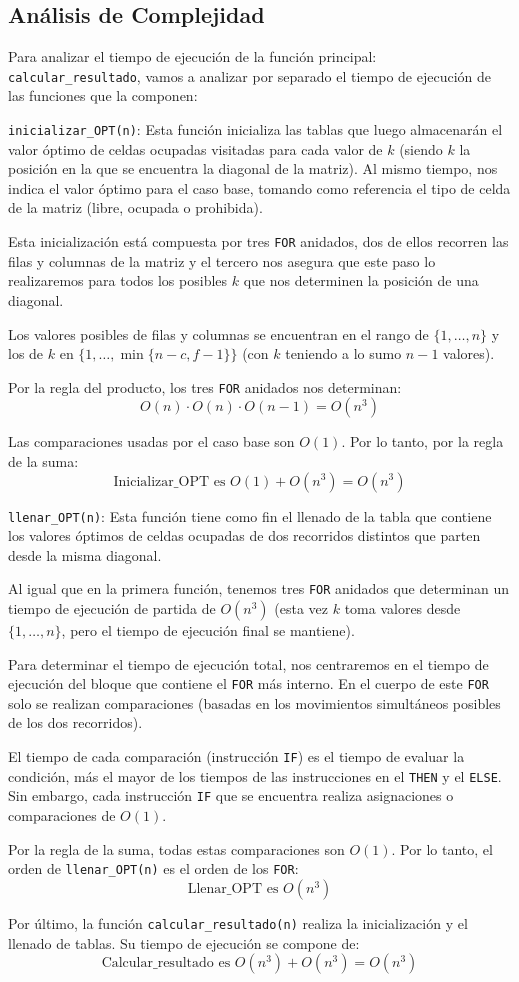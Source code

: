 \subsection{Análisis de Complejidad}
Para analizar el tiempo de ejecución de la función principal: \texttt{calcular\_resultado}, vamos a analizar por separado el tiempo de ejecución de las funciones que la componen:

\texttt{inicializar\_OPT(n)}: Esta función inicializa las tablas que luego almacenarán el valor óptimo de celdas ocupadas visitadas para cada valor de \( k \) (siendo \( k \) la posición en la que se encuentra la diagonal de la matriz). Al mismo tiempo, nos indica el valor óptimo para el caso base, tomando como referencia el tipo de celda de la matriz (libre, ocupada o prohibida).

Esta inicialización está compuesta por tres \texttt{FOR} anidados, dos de ellos recorren las filas y columnas de la matriz y el tercero nos asegura que este paso lo realizaremos para todos los posibles \( k \) que nos determinen la posición de una diagonal.

Los valores posibles de filas y columnas se encuentran en el rango de \(\{1,\ldots,n\}\) y los de \( k \) en \(\{1,\ldots,\min\{n-c,f-1\}\}\) (con \( k \) teniendo a lo sumo \( n-1 \) valores).

Por la regla del producto, los tres \texttt{FOR} anidados nos determinan:
\[
	O(n) \cdot O(n) \cdot O(n-1) = O(n^3)
\]

Las comparaciones usadas por el caso base son \( O(1) \). Por lo tanto, por la regla de la suma:
\[
	\text{Inicializar\_OPT es } O(1) + O(n^3) = O(n^3)
\]

\texttt{llenar\_OPT(n)}: Esta función tiene como fin el llenado de la tabla que contiene los valores óptimos de celdas ocupadas de dos recorridos distintos que parten desde la misma diagonal.

Al igual que en la primera función, tenemos tres \texttt{FOR} anidados que determinan un tiempo de ejecución de partida de \( O(n^3) \) (esta vez \( k \) toma valores desde \(\{1,\ldots,n\}\), pero el tiempo de ejecución final se mantiene).

Para determinar el tiempo de ejecución total, nos centraremos en el tiempo de ejecución del bloque que contiene el \texttt{FOR} más interno. En el cuerpo de este \texttt{FOR} solo se realizan comparaciones (basadas en los movimientos simultáneos posibles de los dos recorridos).

El tiempo de cada comparación (instrucción \texttt{IF}) es el tiempo de evaluar la condición, más el mayor de los tiempos de las instrucciones en el \texttt{THEN} y el \texttt{ELSE}. Sin embargo, cada instrucción \texttt{IF} que se encuentra realiza asignaciones o comparaciones de \( O(1) \).

Por la regla de la suma, todas estas comparaciones son \( O(1) \). Por lo tanto, el orden de \texttt{llenar\_OPT(n)} es el orden de los \texttt{FOR}:
\[
	\text{Llenar\_OPT es } O(n^3)
\]

Por último, la función \texttt{calcular\_resultado(n)} realiza la inicialización y el llenado de tablas. Su tiempo de ejecución se compone de:
\[
	\text{Calcular\_resultado es } O(n^3) + O(n^3) = O(n^3)
\]
